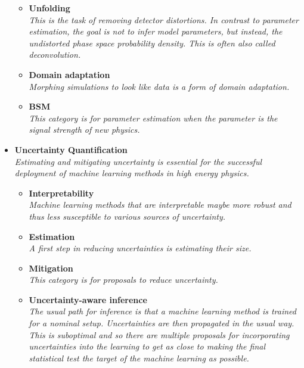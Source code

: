 \documentclass[12pt,letterpaper]{article}
\begin{document}
\begin{itemize}
\begin{itemize}
		\item \textbf{Unfolding}~\cite{Andreassen:2019cjw,Datta:2018mwd,Bellagente:2019uyp,Gagunashvili:2010zw,Glazov:2017vni,Martschei:2012pr,Lindemann:1995ut,Zech2003BinningFreeUB,1800956,Vandegar:2020yvw,Howard:2021pos,Baron:2021vvl}
		\\\textit{This is the task of removing detector distortions.  In contrast to parameter estimation, the goal is not to infer model parameters, but instead, the undistorted phase space probability density.  This is often also called deconvolution.}
		\item \textbf{Domain adaptation}~\cite{Rogozhnikov:2016bdp,Andreassen:2019nnm,Cranmer:2015bka,2009.03796}
		\\\textit{Morphing simulations to look like data is a form of domain adaptation.}
		\item \textbf{BSM}~\cite{Andreassen:2020nkr,Hollingsworth:2020kjg,Brehmer:2018kdj,Brehmer:2018eca,Brehmer:2018hga,Brehmer:2019xox,Romao:2020ojy}
		\\\textit{This category is for parameter estimation when the parameter is the signal strength of new physics.}
	\end{itemize}
\item \textbf{Uncertainty Quantification}
\\\textit{Estimating and mitigating uncertainty is essential for the successful deployment of machine learning methods in high energy physics. }
	\begin{itemize}
		\item \textbf{Interpretability}~\cite{deOliveira:2015xxd,Chang:2017kvc,Diefenbacher:2019ezd,Agarwal:2020fpt,Grojean:2020ech,Romero:2021qlf}
		\\\textit{Machine learning methods that are interpretable maybe more robust and thus less susceptible to various sources of uncertainty.}
		\item \textbf{Estimation}~\cite{Nachman:2019dol,Nachman:2019yfl,Barnard:2016qma,Bellagente:2021yyh}
		\\\textit{A first step in reducing uncertainties is estimating their size.}
		\item \textbf{Mitigation}~\cite{Estrade:DLPS2017,Englert:2018cfo,Louppe:2016ylz,Araz:2021wqm}
		\\\textit{This category is for proposals to reduce uncertainty.}
		\item \textbf{Uncertainty-aware inference}~\cite{Caron:2019xkx,Bollweg:2019skg,deCastro:2018mgh,Wunsch:2020iuh}
		\\\textit{The usual path for inference is that a machine learning method is trained for a nominal setup.  Uncertainties are then propagated in the usual way.  This is suboptimal and so there  are multiple proposals for incorporating uncertainties into the learning to get as close to making the final statistical test the target of the machine learning as possible.}

\end{itemize}
\end{itemize}
\end{document}
